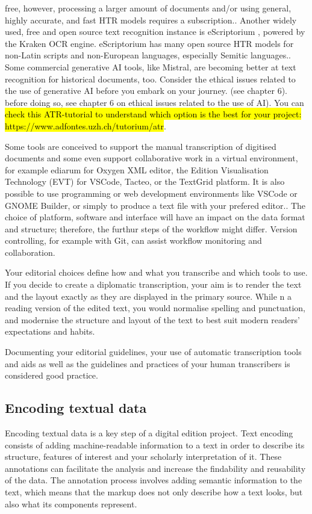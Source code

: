 \documentclass[
  letterpaper,
  DIV=11,
  numbers=noendperiod]{scrreprt}
\begin{document}
free, however, processing a larger amount of documents and/or using
general, highly accurate, and fast HTR models requires a subscription..
Another widely used, free and open source text recognition instance is
eScriptorium , powered by the Kraken OCR engine. eScriptorium has many
open source HTR models for non-Latin scripts and non-European languages,
especially Semitic languages.. Some commercial generative AI tools, like
Mistral, are becoming better at text recognition for historical
documents, too. Consider the ethical issues related to the use of
generative AI before you embark on your journey. (see chapter 6). before
doing so, see chapter 6 on ethical issues related to the use of AI). You
can \hl{check this ATR-tutorial to understand which option is the best
for your project: https://www.adfontes.uzh.ch/tutorium/atr}.

Some tools are conceived to support the manual transcription of
digitised documents and some even support collaborative work in a
virtual environment, for example ediarum for Oxygen XML editor, the
Edition Visualisation Technology (EVT) for VSCode, Tacteo, or the
TextGrid platform. It is also possible to use programming or web
development environments like VSCode or GNOME Builder, or simply to
produce a text file with your prefered editor.. The choice of platform,
software and interface will have an impact on the data format and
structure; therefore, the furthur steps of the workflow might differ.
Version controlling, for example with Git, can assist workflow
monitoring and collaboration.

Your editorial choices define how and what you transcribe and which
tools to use. If you decide to create a diplomatic transcription, your
aim is to render the text and the layout exactly as they are displayed
in the primary source. While n a reading version of the edited text, you
would normalise spelling and punctuation, and modernise the structure
and layout of the text to best suit modern readers' expectations and
habits.

Documenting your editorial guidelines, your use of automatic
transcription tools and aids as well as the guidelines and practices of
your human transcribers is considered good practice.

\subsection{Encoding textual data}\label{encoding-textual-data}

Encoding textual data is a key step of a digital edition project. Text
encoding consists of adding machine-readable information to a text in
order to describe its structure, features of interest and your scholarly
interpretation of it. These annotations can facilitate the analysis and
increase the findability and reusability of the data. The annotation
process involves adding semantic information to the text, which means
that the markup does not only describe how a text looks, but also what
its components represent.
\end{document}
